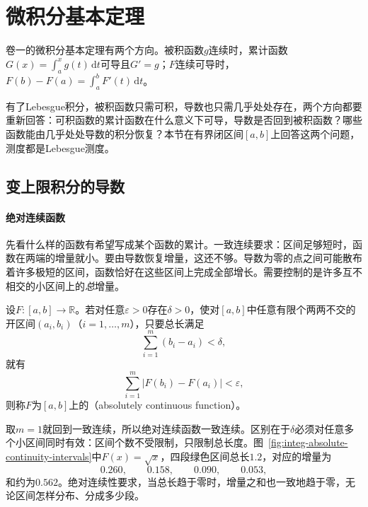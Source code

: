 \section{微积分基本定理}
\label{sec:integ-ftc}

卷一的微积分基本定理有两个方向。被积函数$g$连续时，累计函数$G(x)=\int_a^xg(t)\,\mathrm dt$可导且$G'=g$；$F$连续可导时，$F(b)-F(a)=\int_a^bF'(t)\,\mathrm dt$。

有了Lebesgue积分，被积函数只需可积，导数也只需几乎处处存在，两个方向都要重新回答：可积函数的累计函数在什么意义下可导，导数是否回到被积函数？哪些函数能由几乎处处导数的积分恢复？本节在有界闭区间$[a,b]$上回答这两个问题，测度都是Lebesgue测度。

\subsection{变上限积分的导数}
\label{sec:integ-indefinite-derivative}

\paragraph{绝对连续函数}
先看什么样的函数有希望写成某个函数的累计。一致连续要求：区间足够短时，函数在两端的增量就小。要由导数恢复增量，这还不够。导数为零的点之间可能散布着许多极短的区间，函数恰好在这些区间上完成全部增长。需要控制的是许多互不相交的小区间上的\emph{总}增量。

\begin{definition}[绝对连续函数]
\label{def:integ-absolutely-continuous}
设$F:[a,b]\to\mathbb R$。若对任意$\varepsilon>0$存在$\delta>0$，使对$[a,b]$中任意有限个两两不交的开区间$(a_i,b_i)$（$i=1,\dots,m$），只要总长满足
\begin{equation}
 \sum_{i=1}^m(b_i-a_i)<\delta,
 \label{eq:integ-ac-length}
\end{equation}
就有
\begin{equation}
 \sum_{i=1}^m\lvert F(b_i)-F(a_i)\rvert<\varepsilon,
 \label{eq:integ-ac-increment}
\end{equation}
则称$F$为$[a,b]$上的（absolutely continuous function）。
\end{definition}

取$m=1$就回到一致连续，所以绝对连续函数一致连续。区别在于$\delta$必须对任意多个小区间同时有效：区间个数不受限制，只限制总长度。图~\ref{fig:integ-absolute-continuity-intervals}中$F(x)=\sqrt x$，四段绿色区间总长$1.2$，对应的增量为
\[
 0.260,\qquad0.158,\qquad0.090,\qquad0.053,
\]
和约为$0.562$。绝对连续性要求，当总长趋于零时，增量之和也一致地趋于零，无论区间怎样分布、分成多少段。

